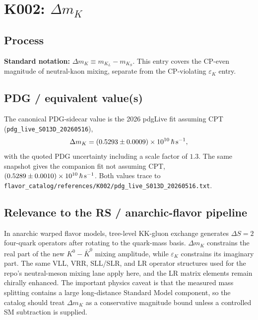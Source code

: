 
\section{\texorpdfstring{K002: \(\Delta m_K\)}{K002: Delta m K}}

\subsection*{Process}
\textbf{Standard notation:} \(\Delta m_K \equiv m_{K_L}-m_{K_S}\).  This entry
covers the CP-even magnitude of neutral-kaon mixing, separate from the
CP-violating \(\varepsilon_K\) entry.

\subsection*{PDG / equivalent value(s)}
The canonical PDG-sidecar value is the 2026 pdgLive fit assuming CPT
(\texttt{pdg\_live\_S013D\_20260516}),
\[
  \Delta m_K = (0.5293\pm0.0009)\times 10^{10}\,\hbar\,{\rm s}^{-1},
\]
with the quoted PDG uncertainty including a scale factor of \(1.3\).  The same
snapshot gives the companion fit not assuming CPT,
\((0.5289\pm0.0010)\times 10^{10}\,\hbar\,{\rm s}^{-1}\).  Both values trace
to \texttt{flavor\_catalog/references/K002/pdg\_live\_S013D\_20260516.txt}.

\subsection*{Relevance to the RS / anarchic-flavor pipeline}
In anarchic warped flavor models, tree-level KK-gluon exchange generates
\(\Delta S=2\) four-quark operators after rotating to the quark-mass basis.
\(\Delta m_K\) constrains the real part of the new \(K^0-\bar K^0\) mixing
amplitude, while \(\varepsilon_K\) constrains its imaginary part.  The same
VLL, VRR, SLL/SLR, and LR operator structures used for the repo's neutral-meson
mixing lane apply here, and the LR matrix elements remain chirally enhanced.
The important physics caveat is that the measured mass splitting contains a
large long-distance Standard Model component, so the catalog should treat
\(\Delta m_K\) as a conservative magnitude bound unless a controlled SM
subtraction is supplied.

